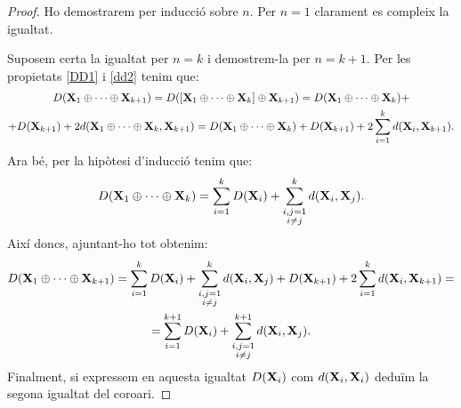 \documentclass{article}
\theoremstyle{math}
\theoremstyle{TheoremNum}
\newcommand{\0}{\ensuremath{\vb{0}}}
\newcommand{\X}{\ensuremath{\vb{X}}}
\begin{document}
\begin{proof}
    Ho demostrarem per inducció sobre $n$. Per $n=1$ clarament es compleix la igualtat.\par 
    \noindent Suposem certa la igualtat per $n=k$ i demostrem-la per $n=k+1$. Per les propietats \ref{DD1} i \ref{dd2} tenim que:
    \begin{multline*}
        D(\X_1\oplus\cdots\oplus\X_{k+1})=D([\X_1\oplus\cdots\oplus\X_k]\oplus\X_{k+1})=D(\X_1\oplus\cdots\oplus\X_k)+\\+D(\X_{k+1})+2d(\X_1\oplus\cdots\oplus\X_k,\X_{k+1})=D(\X_1\oplus\cdots\oplus\X_k)+D(\X_{k+1})+2\sum_{i=1}^kd(\X_i,\X_{k+1}).
    \end{multline*}
    Ara bé, per la hipòtesi d'inducció tenim que:
    $$D(\X_1\oplus\cdots\oplus\X_k)=\sum_{i=1}^kD(\X_i)+\sum_{\substack{i,j=1\\i\ne j}}^kd(\X_i,\X_j).$$ Així doncs, ajuntant-ho tot obtenim:
    \begin{multline*}
        D(\X_1\oplus\cdots\oplus\X_{k+1})=\sum_{i=1}^kD(\X_i)+\sum_{\substack{i,j=1\\i\ne j}}^kd(\X_i,\X_j)+D(\X_{k+1})+2\sum_{i=1}^kd(\X_i,\X_{k+1})=\\=\sum_{i=1}^{k+1}D(\X_i)+\sum_{\substack{i,j=1\\i\ne j}}^{k+1}d(\X_i,\X_j).
    \end{multline*}
    Finalment, si expressem en aquesta igualtat $D(\X_i)$ com $d(\X_i,\X_i)$ deduïm la segona igualtat del coro\lgem ari.
\end{proof}
\end{document}
